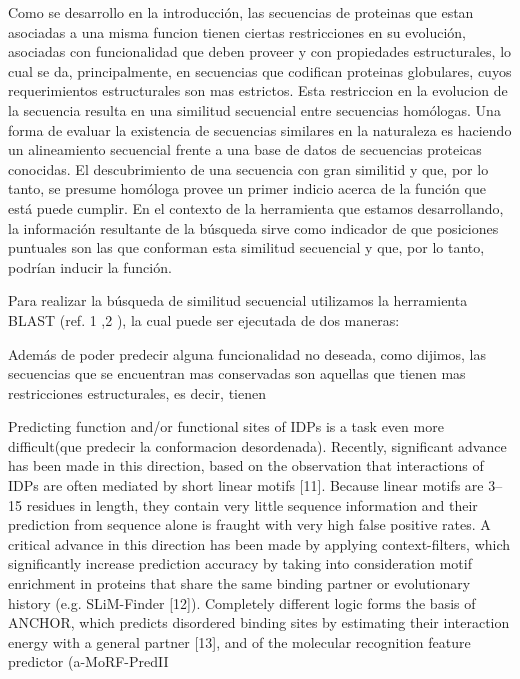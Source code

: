 Como se desarrollo en la introducción, las secuencias de proteinas que estan asociadas a una misma funcion tienen ciertas restricciones en su evolución, asociadas con funcionalidad que deben proveer y con propiedades estructurales, lo cual se da, 
principalmente, en secuencias que codifican proteinas globulares, cuyos requerimientos estructurales son mas estrictos. 
Esta restriccion en la evolucion de la secuencia resulta en una similitud secuencial entre secuencias homólogas.
Una forma de evaluar la existencia de secuencias similares en la naturaleza es haciendo un alineamiento secuencial frente a una base de datos de secuencias proteicas conocidas. 
El descubrimiento de una secuencia con gran similitid y que, por lo tanto, se presume homóloga provee un primer indicio acerca de la función que está puede cumplir. 
En el contexto de la herramienta que estamos desarrollando, la información resultante de la búsqueda sirve como indicador de que posiciones puntuales son las que conforman esta similitud secuencial y que, por lo tanto, podrían inducir la función. 

Para realizar la búsqueda de similitud secuencial utilizamos la herramienta BLAST (ref. 1 ,2 ), la cual puede ser ejecutada de dos maneras:


Además de poder predecir alguna funcionalidad no deseada, como dijimos, las secuencias que se encuentran mas conservadas son aquellas que tienen mas restricciones estructurales, es decir, tienen 




Predicting function and/or functional sites of IDPs is a task even more difficult(que predecir la conformacion desordenada). 
Recently, significant advance has been made in this direction, based on the observation that interactions of IDPs are often mediated by short linear motifs [11]. 
Because linear motifs are 3–15 residues in length, they contain very little sequence information and their prediction from sequence alone is fraught with very
high false positive rates. A critical advance in this direction has been made by applying context-filters, which significantly increase prediction accuracy by taking into
consideration motif enrichment in proteins that share the same binding partner or evolutionary history (e.g. SLiM-Finder [12]). 
Completely different logic forms the basis of ANCHOR, which predicts disordered binding sites by estimating their interaction energy with a general partner [13], and of the molecular recognition feature predictor
(a-MoRF-PredII  






